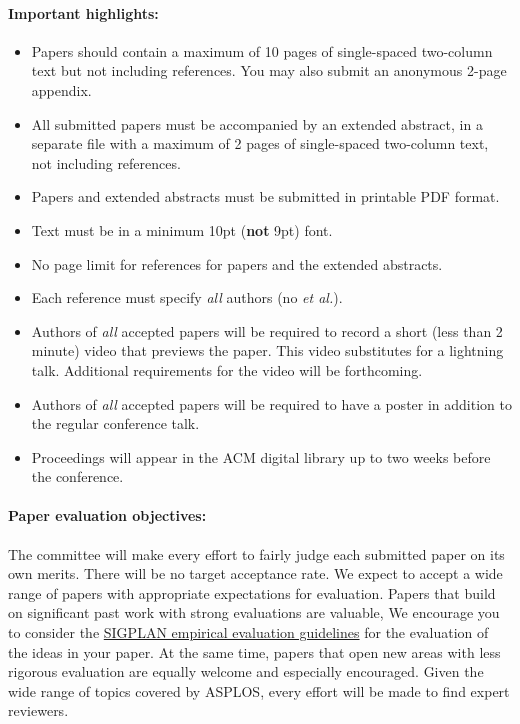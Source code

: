 \documentclass[pageno]{jpaper}
\begin{document}
\paragraph{Important highlights:}
\begin{itemize}
\item Papers should contain a
maximum of 10 pages of single-spaced two-column text but not including
references. You may also submit an anonymous 2-page appendix.
\item All submitted papers must be accompanied by an extended
  abstract, in a separate file with a maximum of 
2 pages of single-spaced two-column text, not including references.
\item Papers and extended abstracts must be submitted in printable PDF format.
\item Text must be in a minimum 10pt ({\bf not} 9pt) font.
\item No page limit for references for papers and the extended abstracts.
\item Each reference must specify {\em all} authors (no {\em et al.}).
\item Authors of {\em all} accepted papers will be required
  to record a short (less than 2 minute) video that previews the paper.
  This video substitutes for a lightning talk.
  Additional requirements for the video will be forthcoming.
\item Authors of {\em all} accepted papers will be required to have a poster in addition to the regular
conference talk.
\item Proceedings will appear in the ACM digital library up to two weeks
before the conference.
\end{itemize}

\paragraph{Paper evaluation objectives:}
The committee will make every effort to fairly judge each submitted paper on
its own merits. There will be no target acceptance rate.  We expect to
accept a wide range of papers with appropriate expectations for
evaluation. Papers that build on significant past work with
strong evaluations are valuable,  We encourage you to consider the
\href{https://www.sigplan.org/Resources/EmpiricalEvaluation/}{SIGPLAN
  empirical evaluation guidelines} for the evaluation of the ideas in
your paper. At the same time,  papers that open new areas with less
rigorous evaluation are equally welcome and especially encouraged.
Given the wide range of topics covered by ASPLOS, every effort will be
made to find expert reviewers.
\end{document}
